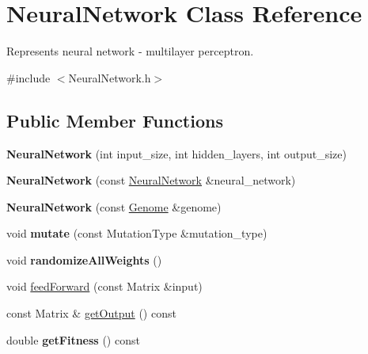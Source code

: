 \hypertarget{classNeuralNetwork}{}\section{Neural\+Network Class Reference}
\label{classNeuralNetwork}


Represents neural network -\/ multilayer perceptron.  




{\ttfamily \#include $<$Neural\+Network.\+h$>$}

\subsection*{Public Member Functions}
\begin{DoxyCompactItemize}
\item 
{\bfseries Neural\+Network} (int input\+\_\+size, int hidden\+\_\+layers, int output\+\_\+size)\hypertarget{classNeuralNetwork_a246f904545417df2801e56277ab8d53f}{}\label{classNeuralNetwork_a246f904545417df2801e56277ab8d53f}

\item 
{\bfseries Neural\+Network} (const \hyperlink{classNeuralNetwork}{Neural\+Network} \&neural\+\_\+network)\hypertarget{classNeuralNetwork_a9b688c5f00977e83fedea7ee021348f1}{}\label{classNeuralNetwork_a9b688c5f00977e83fedea7ee021348f1}

\item 
{\bfseries Neural\+Network} (const \hyperlink{classGenome}{Genome} \&genome)\hypertarget{classNeuralNetwork_a772972afe658adbb165af9e8b384e552}{}\label{classNeuralNetwork_a772972afe658adbb165af9e8b384e552}

\item 
void {\bfseries mutate} (const Mutation\+Type \&mutation\+\_\+type)\hypertarget{classNeuralNetwork_a95ce793f6206c627f4d436be8348eede}{}\label{classNeuralNetwork_a95ce793f6206c627f4d436be8348eede}

\item 
void {\bfseries randomize\+All\+Weights} ()\hypertarget{classNeuralNetwork_a94e3233f8f2f6c2f1e205b67ddca7adf}{}\label{classNeuralNetwork_a94e3233f8f2f6c2f1e205b67ddca7adf}

\item 
void \hyperlink{classNeuralNetwork_a06a48c985365b4f933d0abe8dc894a1c}{feed\+Forward} (const Matrix \&input)
\item 
const Matrix \& \hyperlink{classNeuralNetwork_a151d07a86bcb717704c3ff8a2f6f35ad}{get\+Output} () const 
\item 
double {\bfseries get\+Fitness} () const \hypertarget{classNeuralNetwork_a6a8e4dfa1a2efcb63a576cac81fb9fe4}{}\label{classNeuralNetwork_a6a8e4dfa1a2efcb63a576cac81fb9fe4}


\end{DoxyCompactItemize}
